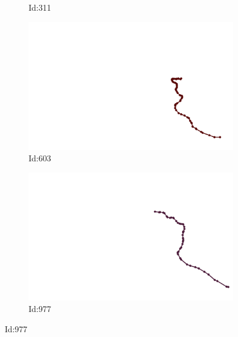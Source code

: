 \documentclass[12pt,twoside]{report}
\begin{document}
\begin{figure}
\begin{subfigure}[b]{0.20\textwidth}
\caption{Id:311}
\end{subfigure}
\begin{subfigure}[b]{0.20\textwidth}
\centering
\includegraphics[width=\textwidth]{../../trajectories/603.png}
\caption{Id:603}
\end{subfigure}
\begin{subfigure}[b]{0.20\textwidth}
\centering
\includegraphics[width=\textwidth]{../../trajectories/977.png}
\caption{Id:977}
\end{subfigure}
\end{figure}
\end{document}
